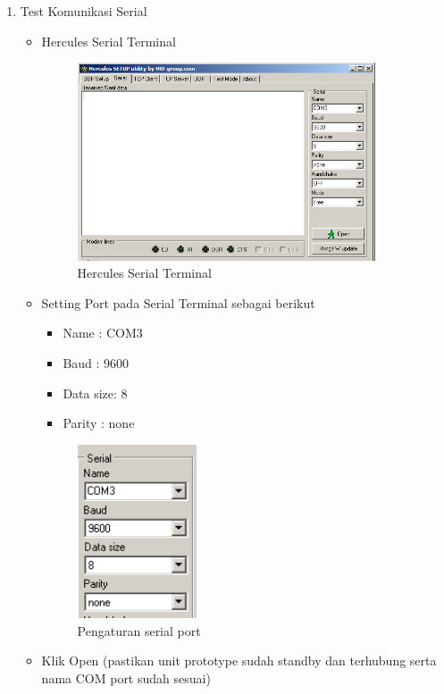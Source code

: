 \documentclass[12pt,]{article}
\begin{document}
\begin{enumerate}
\begin{itemize}
		\end{itemize}
		
		\newpage
		\item Test Komunikasi Serial
		\begin{itemize}
			\item Hercules Serial Terminal
			\begin{figure}[!ht]
				\centering
				\includegraphics[width=250pt]{images/terminal/hercules_terminal}
				\caption{Hercules Serial Terminal}
			\end{figure}
			
			\item Setting Port pada Serial Terminal sebagai berikut
			\begin{itemize}
				\item Name     : COM3
				\item Baud     : 9600
				\item Data size: 8
				\item Parity   : none
			\end{itemize}
			
			\begin{figure}[!ht]
				\centering
				\includegraphics[width=100pt]{images/terminal/hercules_port}
				\caption{Pengaturan serial port}
			\end{figure}
			
			\item Klik Open (pastikan unit prototype sudah standby dan terhubung
			serta nama COM port sudah sesuai)
			

\end{itemize}
\end{enumerate}
\end{document}
